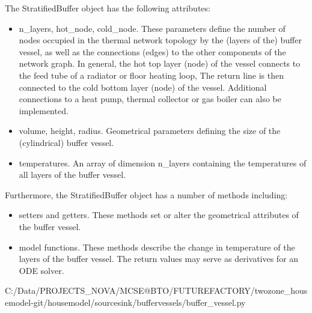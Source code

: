 The \textsf{StratifiedBuffer} object has the following attributes:

\begin{itemize}
	\item \textsf{n\_layers, hot\_node, cold\_node}. These parameters define the number of nodes occupied in the thermal network topology by the (layers of the) buffer vessel, as well as the connections (edges) to the other components of the network graph. In general, the hot top layer (node) of the vessel connects to the feed tube of a radiator or floor heating loop, The return line is then connected to the cold bottom layer (node) of the vessel. Additional connections to a heat pump, thermal collector or gas boiler can also be implemented.
	\item \textsf{volume, height, radius}. Geometrical parameters defining the size of the (cylindrical) buffer vessel.
	\item \textsf{temperatures}. An array of dimension \textsf{n\_layers} containing the temperatures of all layers of the buffer vessel.
\end{itemize}

Furthermore, the \textsf{StratifiedBuffer} object has a number of methods including:

\begin{itemize}
	\item \textsf{setters and getters}. These methods set or alter the geometrical attributes of the buffer vessel.
	\item \textsf{model functions}. These methods describe the change in temperature of the layers of the buffer vessel. The return values may serve as derivatives for an ODE solver.
\end{itemize}

 
{C:/Data/PROJECTS_NOVA/MCSE@BTO/FUTUREFACTORY/twozone_housemodel-git/housemodel/sourcesink/buffervessels/buffer_vessel.py}























\newpage
